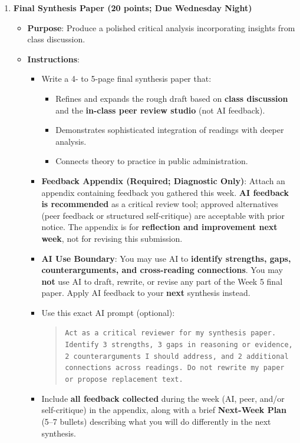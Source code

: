 \documentclass[11pt]{article}     %
\begin{document}
\begin{enumerate}
\item \textbf{Final Synthesis Paper (20 points; Due Wednesday Night)}
\begin{itemize}
    \item \textbf{Purpose}: Produce a polished critical analysis incorporating insights from class discussion.
    \item \textbf{Instructions}:
    \begin{itemize}
        \item Write a 4- to 5-page final synthesis paper that:
        \begin{itemize}
            \item Refines and expands the rough draft based on \textbf{class discussion} and the \textbf{in-class peer review studio} (not AI feedback).
            \item Demonstrates sophisticated integration of readings with deeper analysis.
            \item Connects theory to practice in public administration.
        \end{itemize}

        \item \textbf{Feedback Appendix (Required; Diagnostic Only)}: Attach an appendix containing feedback you gathered this week. \textbf{AI feedback is recommended} as a critical review tool; approved alternatives (peer feedback or structured self-critique) are acceptable with prior notice. The appendix is for \textbf{reflection and improvement next week}, not for revising this submission.

        \item \textbf{AI Use Boundary}: You may use AI to \textbf{identify strengths, gaps, counterarguments, and cross-reading connections}. You may \textbf{not} use AI to draft, rewrite, or revise any part of the Week 5 final paper. Apply AI feedback to your \textbf{next} synthesis instead.

        \item Use this exact AI prompt (optional):
        \begin{quote}
            \texttt{Act as a critical reviewer for my synthesis paper. Identify 3 strengths, 3 gaps in reasoning or evidence, 2 counterarguments I should address, and 2 additional connections across readings. Do not rewrite my paper or propose replacement text.}
        \end{quote}

        \item Include \textbf{all feedback collected} during the week (AI, peer, and/or self-critique) in the appendix, along with a brief \textbf{Next-Week Plan} (5--7 bullets) describing what you will do differently in the next synthesis.
    \end{itemize}
\end{itemize}


\end{enumerate}
\end{document}
